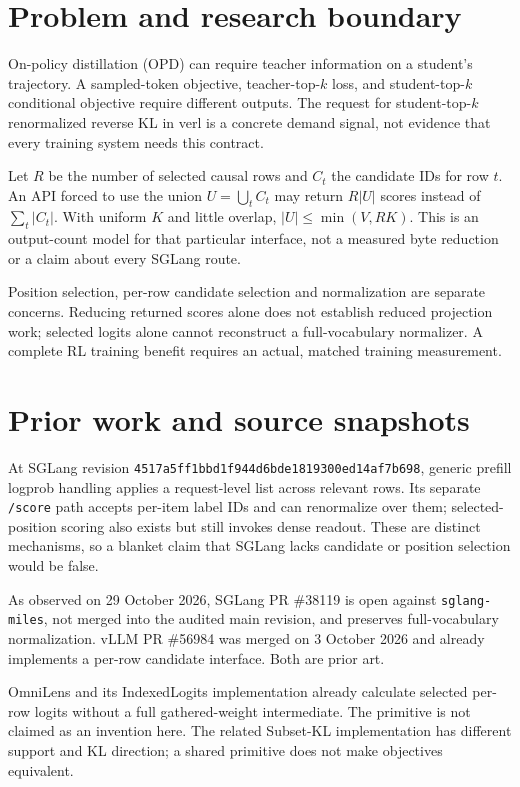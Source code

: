 \documentclass[11pt,a4paper]{article}
\newcommand{\code}[1]{{\small\nolinkurl{#1}}}
\begin{document}
\section{Problem and research boundary}
On-policy distillation (OPD) can require teacher information on a student's trajectory. A sampled-token objective, teacher-top-$k$ loss, and student-top-$k$ conditional objective require different outputs. The request for student-top-$k$ renormalized reverse KL in verl is a concrete demand signal, not evidence that every training system needs this contract.\cite{verl6676,verlteacher,verlloss}

Let $R$ be the number of selected causal rows and $C_t$ the candidate IDs for row $t$. An API forced to use the union $U=\bigcup_t C_t$ may return $R|U|$ scores instead of $\sum_t |C_t|$. With uniform $K$ and little overlap, $|U|\leq\min(V,RK)$. This is an output-count model for that particular interface, not a measured byte reduction or a claim about every SGLang route.

Position selection, per-row candidate selection and normalization are separate concerns. Reducing returned scores alone does not establish reduced projection work; selected logits alone cannot reconstruct a full-vocabulary normalizer. A complete RL training benefit requires an actual, matched training measurement.
\section{Prior work and source snapshots}
At SGLang revision \code{4517a5ff1bbd1f944d6bde1819300ed14af7b698}, generic prefill logprob handling applies a request-level list across relevant rows. Its separate \code{/score} path accepts per-item label IDs and can renormalize over them; selected-position scoring also exists but still invokes dense readout. These are distinct mechanisms, so a blanket claim that SGLang lacks candidate or position selection would be false.\cite{sglangio,sglanglogprob,sglangscore,sglanglogits}

As observed on 29 October 2026, SGLang PR \#38119 is open against \code{sglang-miles}, not merged into the audited main revision, and preserves full-vocabulary normalization. vLLM PR \#56984 was merged on 3 October 2026 and already implements a per-row candidate interface. Both are prior art.\cite{sglang38119,vllm56984}

OmniLens and its IndexedLogits implementation already calculate selected per-row logits without a full gathered-weight intermediate. The primitive is not claimed as an invention here. The related Subset-KL implementation has different support and KL direction; a shared primitive does not make objectives equivalent.\cite{omnilens2026,indexedlogits,subsetkl}
\end{document}
